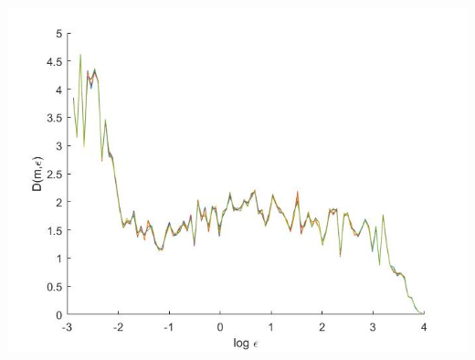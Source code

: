 \documentclass{article}
\begin{document}
\begin{minipage}{\linewidth}
{
\centering
\includegraphics[scale=0.4]{images/prob4d.jpg}
\label{fig:prob4d}
}
\end{minipage}
\end{document}
